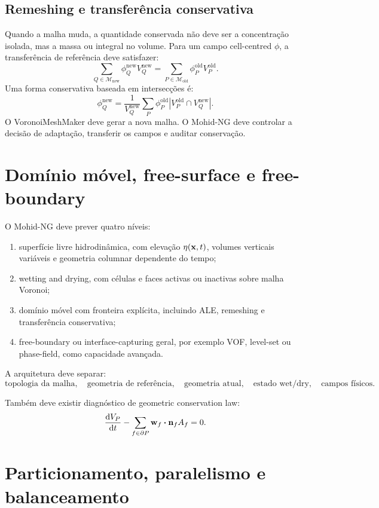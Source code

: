 \documentclass[11pt,a4paper]{article}
\begin{document}
\subsection{Remeshing e transfer\^encia conservativa}

Quando a malha muda, a quantidade conservada n\~ao deve ser a concentra\c{c}\~ao isolada, mas a massa ou integral no volume. Para um campo cell-centred \(\phi\), a transfer\^encia de refer\^encia deve satisfazer:
\[
\sum_{Q\in\mathcal{M}_{\mathrm{new}}}\phi_Q^{\mathrm{new}}V_Q^{\mathrm{new}}
=
\sum_{P\in\mathcal{M}_{\mathrm{old}}}\phi_P^{\mathrm{old}}V_P^{\mathrm{old}}.
\]
Uma forma conservativa baseada em intersec\c{c}\~oes \'e:
\[
\phi_Q^{\mathrm{new}}
=
\frac{1}{V_Q^{\mathrm{new}}}
\sum_P \phi_P^{\mathrm{old}}\left|V_P^{\mathrm{old}}\cap V_Q^{\mathrm{new}}\right|.
\]
O VoronoiMeshMaker deve gerar a nova malha. O Mohid-NG deve controlar a decis\~ao de adapta\c{c}\~ao, transferir os campos e auditar conserva\c{c}\~ao.

\section{Dom\'inio m\'ovel, free-surface e free-boundary}

O Mohid-NG deve prever quatro n\'iveis:
\begin{enumerate}
  \item superf\'icie livre hidrodin\^amica, com eleva\c{c}\~ao \(\eta(\vb{x},t)\), volumes verticais vari\'aveis e geometria columnar dependente do tempo;
  \item wetting and drying, com c\'elulas e faces activas ou inactivas sobre malha Voronoi;
  \item dom\'inio m\'ovel com fronteira expl\'icita, incluindo ALE, remeshing e transfer\^encia conservativa;
  \item free-boundary ou interface-capturing geral, por exemplo VOF, level-set ou phase-field, como capacidade avan\c{c}ada.
\end{enumerate}

A arquitetura deve separar:
\[
\text{topologia da malha},\quad
\text{geometria de refer\^encia},\quad
\text{geometria atual},\quad
\text{estado wet/dry},\quad
\text{campos f\'isicos}.
\]

Tamb\'em deve existir diagn\'ostico de geometric conservation law:
\[
\dv{V_P}{t}-\sum_{f\in\partial P}\vb{w}_f\vdot\vb{n}_fA_f=0.
\]

\section{Particionamento, paralelismo e balanceamento}
\end{document}
